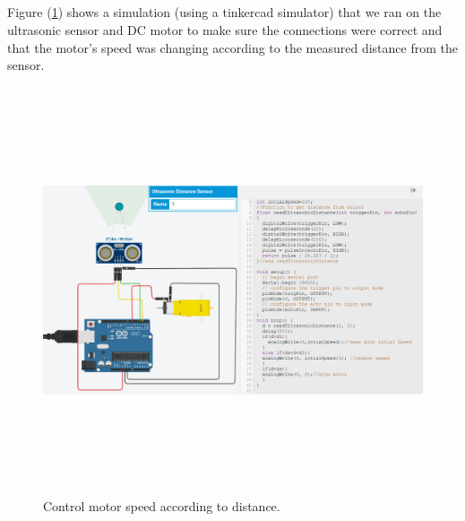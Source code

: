 \documentclass[12pt,a4paper]{report}
\begin{document}
\subsection{\fontsize{12}{12}\selectfont{Control motor speed according to distance using the tinkercad simulator.}}
Figure (\ref{fig:Speed}) shows a simulation (using a tinkercad simulator) that we ran on the ultrasonic sensor and DC motor to make sure the connections were correct and that the motor's speed was changing according to the measured distance from the sensor.
\begin{figure}[H]
    \centering
    \graphicspath{ {./images/} }
    \includegraphics [width=16cm,height=12cm]{motorspeed.PNG}
    \caption{Control motor speed according to distance.}
    \label{fig:Speed}
\end{figure}
\end{document}
